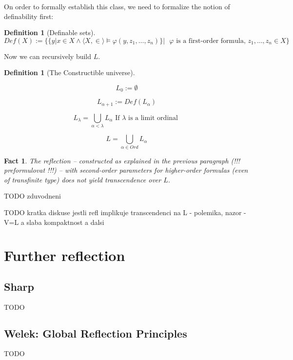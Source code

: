 \documentclass[12pt,a4paper]{article}
\newtheorem{definition}[theorem]{Definition}
\newtheorem{Fact}[theorem]{Fact}
\newcommand{\bce}{\begin{compactenum}}
\newcommand{\ece}{\end{compactenum}}
\begin{document}
On order to formally establish this class, we need to formalize the notion of definability first:

\begin{definition}[Definable sets]
\begin{equation}
Def(X) := \{\{{y | x }\in X \land \langle X, \in \rangle \models \varphi(y, z_1,\ldots,z_n) \} |\mbox{ }\varphi\mbox{ is a first-order formula, }z_1,\ldots,z_n \in X \}
\end{equation}
\end{definition}

Now we can recursively build $L$.
\begin{definition}[The Constructible universe\newline]
\bce[(i)]
\item
\begin{equation}
L_0 := \emptyset
\end{equation}

\item
\begin{equation}
L_{\alpha+1} := Def(L_{\alpha})
\end{equation}
\item
\begin{equation}
L_{\lambda} = \bigcup_{\alpha < \lambda} L_{\alpha}\mbox{ If }\lambda\mbox{ is a limit ordinal }
\end{equation}
\item
\begin{equation}
L = \bigcup_{\alpha\in Ord} L_{\alpha}
\end{equation}
\ece
\end{definition}

\begin{Fact}
The reflection -- constructed as explained in the previous paragraph (!!! preformulovat !!!) -- with second-order parameters for higher-order formulas (even of transfinite type) does not yield transcendence over $L$.
\end{Fact}
TODO zduvodneni

TODO kratka diskuse jestli refl implikuje transcendenci na L - polemika, nazor - V=L a slaba kompaktnost a dalsi
\newpage
\section{Further reflection} %
\subsection{Sharp}
TODO

\subsection{Welek: Global Reflection Principles}
TODO



\end{document}
